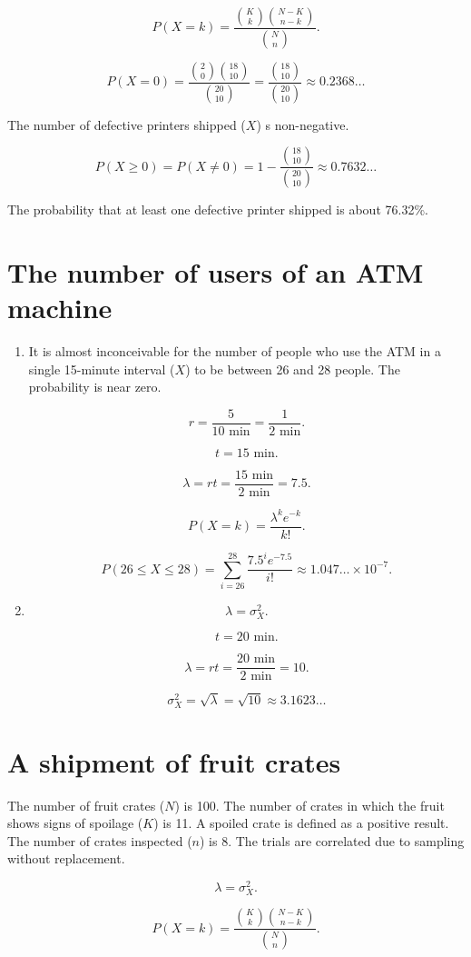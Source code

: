 \documentclass[12pt]{article}
\begin{document}
\[P(X=k)=\frac{\binom{K}{k}\binom{N-K}{n-k}}{\binom{N}{n}}.\]

\[P(X=0)=\frac{\binom{2}{0}\binom{18}{10}}{\binom{20}{10}}=\frac{\binom{18}{10}}{\binom{20}{10}}\approx0.2368\dots\]

The number of defective printers shipped ($X$) s non-negative.

\[P(X\geq 0)=P(X\neq 0)=1-\frac{\binom{18}{10}}{\binom{20}{10}}\approx 0.7632\dots\]

The probability that at least one defective printer shipped is about 76.32\%.
\section{The number of users of an ATM machine}
\begin{enumerate}
\item
It is almost inconceivable for the number of people who use the ATM in a single 15-minute interval ($X$) to be between 26 and 28 people. The probability is near zero. 

\[r=\frac{5}{10\text{ min}}=\frac{1}{2\text{ min}}.\]

\[t=15\text{ min}.\]

\[\lambda=rt=\frac{15\text{ min}}{2\text{ min}}=7.5.\]

\[P(X=k)=\frac{\lambda^ke^{-k}}{k!}.\]

\[P(26\leq X\leq 28)=\sum^{28}_{i=26}{\frac{7.5^ie^{-7.5}}{i!}}\approx 1.047\dotsc\times 10^{-7}.\]

\item
\[\lambda=\sigma^2_X.\]

\[t=20\text{ min}.\]

\[\lambda=rt=\frac{20\text{ min}}{2\text{ min}}=10.\]

\[\sigma^2_X=\sqrt{\lambda}=\sqrt{10}\approx 3.1623\dots\]
\end{enumerate}
\section{A shipment of fruit crates}
The number of fruit crates ($N$) is 100. The number of crates in which the fruit shows signs of spoilage ($K$) is 11. A spoiled crate is defined as a positive result. The number of crates inspected ($n$) is 8. The trials are correlated due to sampling without replacement.

\[\lambda=\sigma^2_X.\]

\[P(X=k)=\frac{\binom{K}{k}\binom{N-K}{n-k}}{\binom{N}{n}}.\]
\end{document}
